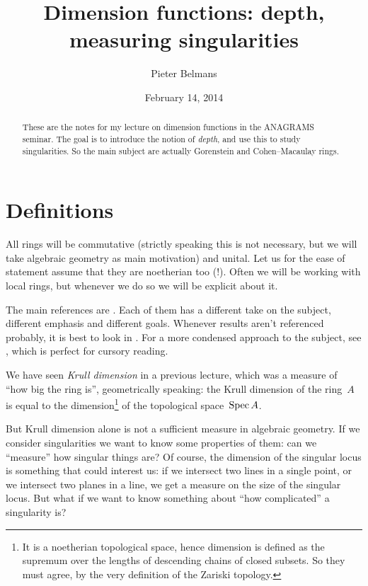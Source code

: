 \documentclass[10pt,a4paper]{article}
\title{Dimension functions: depth, measuring singularities}
\author{Pieter Belmans}
\date{February 14, 2014}
\begin{document}
\maketitle

\begin{abstract}
  These are the notes for my lecture on dimension functions in the ANAGRAMS seminar. The goal is to introduce the notion of \emph{depth}, and use this to study singularities. So the main subject are actually Gorenstein and Cohen--Macaulay rings.
\end{abstract}

\tableofcontents

\clearpage

\section{Definitions}
\label{section:definitions}
All rings will be commutative (strictly speaking this is not necessary, but we will take algebraic geometry as main motivation) and unital. Let us for the ease of statement assume that they are noetherian too (!). Often we will be working with local rings, but whenever we do so we will be explicit about it.

The main references are \cite{sga2,eisenbud-commutative-algebra,serre-algebre-locale,24-hours-of-local-cohomology}. Each of them has a different take on the subject, different emphasis and different goals. Whenever results aren't referenced probably, it is best to look in \cite{eisenbud-commutative-algebra}. For a more condensed approach to the subject, see \cite{24-hours-of-local-cohomology}, which is perfect for cursory reading.

We have seen \emph{Krull dimension} in a previous lecture, which was a measure of ``how big the ring is'', geometrically speaking: the Krull dimension of the ring~$A$ is equal to the dimension\footnote{It is a noetherian topological space, hence dimension is defined as the supremum over the lengths of descending chains of closed subsets. So they must agree, by the very definition of the Zariski topology.} of the topological space~$\operatorname{Spec} A$.

But Krull dimension alone is not a sufficient measure in algebraic geometry. If we consider singularities we want to know some properties of them: can we ``measure'' how singular things are? Of course, the dimension of the singular locus is something that could interest us: if we intersect two lines in a single point, or we intersect two planes in a line, we get a measure on the size of the singular locus. But what if we want to know something about ``how complicated'' a singularity is?
\end{document}
